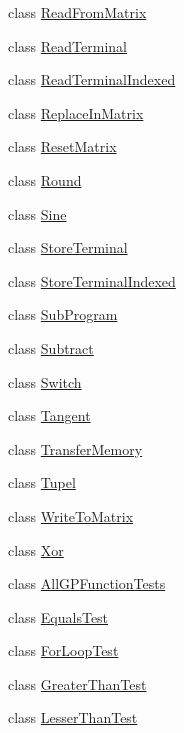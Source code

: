 \begin{DoxyCompactItemize}
\item 
class \hyperlink{classorg_1_1jgap_1_1gp_1_1function_1_1_read_from_matrix}{Read\-From\-Matrix}
\item 
class \hyperlink{classorg_1_1jgap_1_1gp_1_1function_1_1_read_terminal}{Read\-Terminal}
\item 
class \hyperlink{classorg_1_1jgap_1_1gp_1_1function_1_1_read_terminal_indexed}{Read\-Terminal\-Indexed}
\item 
class \hyperlink{classorg_1_1jgap_1_1gp_1_1function_1_1_replace_in_matrix}{Replace\-In\-Matrix}
\item 
class \hyperlink{classorg_1_1jgap_1_1gp_1_1function_1_1_reset_matrix}{Reset\-Matrix}
\item 
class \hyperlink{classorg_1_1jgap_1_1gp_1_1function_1_1_round}{Round}
\item 
class \hyperlink{classorg_1_1jgap_1_1gp_1_1function_1_1_sine}{Sine}
\item 
class \hyperlink{classorg_1_1jgap_1_1gp_1_1function_1_1_store_terminal}{Store\-Terminal}
\item 
class \hyperlink{classorg_1_1jgap_1_1gp_1_1function_1_1_store_terminal_indexed}{Store\-Terminal\-Indexed}
\item 
class \hyperlink{classorg_1_1jgap_1_1gp_1_1function_1_1_sub_program}{Sub\-Program}
\item 
class \hyperlink{classorg_1_1jgap_1_1gp_1_1function_1_1_subtract}{Subtract}
\item 
class \hyperlink{classorg_1_1jgap_1_1gp_1_1function_1_1_switch}{Switch}
\item 
class \hyperlink{classorg_1_1jgap_1_1gp_1_1function_1_1_tangent}{Tangent}
\item 
class \hyperlink{classorg_1_1jgap_1_1gp_1_1function_1_1_transfer_memory}{Transfer\-Memory}
\item 
class \hyperlink{classorg_1_1jgap_1_1gp_1_1function_1_1_tupel}{Tupel}
\item 
class \hyperlink{classorg_1_1jgap_1_1gp_1_1function_1_1_write_to_matrix}{Write\-To\-Matrix}
\item 
class \hyperlink{classorg_1_1jgap_1_1gp_1_1function_1_1_xor}{Xor}
\item 
class \hyperlink{classorg_1_1jgap_1_1gp_1_1function_1_1_all_g_p_function_tests}{All\-G\-P\-Function\-Tests}
\item 
class \hyperlink{classorg_1_1jgap_1_1gp_1_1function_1_1_equals_test}{Equals\-Test}
\item 
class \hyperlink{classorg_1_1jgap_1_1gp_1_1function_1_1_for_loop_test}{For\-Loop\-Test}
\item 
class \hyperlink{classorg_1_1jgap_1_1gp_1_1function_1_1_greater_than_test}{Greater\-Than\-Test}
\item 
class \hyperlink{classorg_1_1jgap_1_1gp_1_1function_1_1_lesser_than_test}{Lesser\-Than\-Test}
\end{DoxyCompactItemize}
